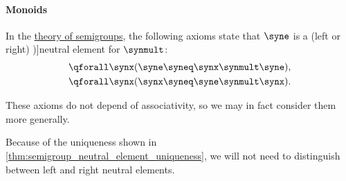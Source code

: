 \paragraph{Monoids}

\begin{definition}\label{def:semigroup_neutral_element}
  In the \hyperref[def:semigroup/theory]{theory of semigroups}, the following axioms state that \( \syne \) is a (left or right) \term[ru=нейтральный елемент, en=neutral element (\cite[7]{Perrone2024StartingCategoryTheory})]{neutral element} for \( {\synmult} \):
  \begin{align}
    \qforall \synx (\syne \syneq \synx \synmult \syne), \label{eq:def:semigroup_neutral_element/left} \\
    \qforall \synx (\synx \syneq \syne \synmult \synx). \label{eq:def:semigroup_neutral_element/right}
  \end{align}

  These axioms do not depend of associativity, so we may in fact consider them more generally.

  Because of the uniqueness shown in \cref{thm:semigroup_neutral_element_uniqueness}, we will not need to distinguish between left and right neutral elements.
\end{definition}

